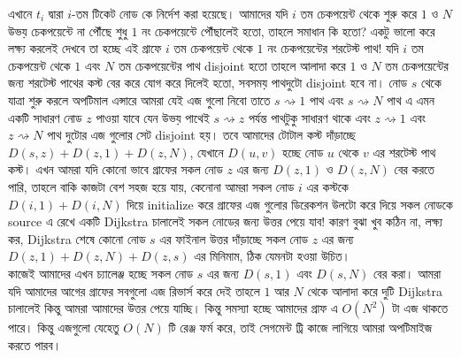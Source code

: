 \documentclass[11pt]{article}
\begin{document}
\begin{center}
\end{center}
এখানে $t_i$ দ্বারা $i$-তম টিকেট নোড কে নির্দেশ করা হয়েছে। আমাদের যদি $i$ তম চেকপয়েন্ট থেকে শুরু করে $1$ ও $N$ উভয় চেকপয়েন্টে না পৌঁছে শুধু $1$ নং চেকপয়েন্টে পৌঁছালেই হতো, তাহলে সমাধান কি হতো? একটু ভালো করে লক্ষ্য করলেই দেখবে তা হচ্ছে এই গ্রাফে $i$ তম চেকপয়েন্ট থেকে $1$ নং চেকপয়েন্টের শরটেস্ট পাথ! যদি $i$ তম চেকপয়েন্ট থেকে $1$ এবং $N$ তম চেকপয়েন্টের পাথ disjoint হতো তাহলে আলাদা করে $1$ ও $N$ তম চেকপয়েন্টের জন্য শরটেস্ট পাথের কস্ট বের করে যোগ করে দিলেই হতো, সবসময় পাথদুটো disjoint হবে না। নোড $s$ থেকে যাত্রা শুরু করলে অপটিমাল এন্সারে আমরা যেই এজ গুলো নিবো তাতে $s \rightsquigarrow 1$ পাথ এবং $s \rightsquigarrow N$ পাথ এ এমন একটি সাধারণ নোড $z$ পাওয়া যাবে যেন উভয় পাথেই $s \rightsquigarrow z$ পর্যন্ত পাথটুকু সাধারণ থাকে এবং $z \rightsquigarrow 1$ এবং $z \rightsquigarrow N$ পাথ দুটোর এজ গুলোর সেট disjoint হয়। তবে আমাদের টোটাল কস্ট দাঁড়াচ্ছে $D(s,z) + D(z,1)+D(z,N)$, যেখানে $D(u,v)$ হচ্ছে নোড $u$ থেকে $v$ এর শরটেস্ট পাথ কস্ট। এখন আমরা যদি কোনো ভাবে গ্রাফের সকল নোড $z$ এর জন্য $D(z, 1)$ ও $D(z,N)$ বের করতে পারি, তাহলে বাকি কাজটা বেশ সহজ হয়ে যায়, কেনোনা আমরা সকল নোড $i$ এর কস্টকে $D(i,1)+D(i,N)$ দিয়ে initialize করে গ্রাফের এজ গুলোর ডিরেকশন উলটো করে দিয়ে সকল নোডকে source এ রেখে একটি Dijkstra চালালেই সকল নোডের জন্য উত্তর পেয়ে যাব! কারণ বুঝা খুব কঠিন না, লক্ষ্য কর, Dijkstra শেষে কোনো নোড $s$ এর ফাইনাল উত্তর দাঁড়াচ্ছে সকল নোড $z$ এর জন্য $D(z,1)+D(z,N)+D(z,s)$ এর মিনিমাম, ঠিক যেমনটা হওয়া উচিত। 
\\
কাজেই আমাদের এখন চ্যালেঞ্জ হচ্ছে সকল নোড $s$ এর জন্য $D(s,1)$ এবং $D(s,N)$ বের করা। আমরা যদি আমাদের আগের গ্রাফের সবগুলো এজ রিভার্স করে দেই তাহলে $1$ আর $N$ থেকে আলাদা করে দুটি Dijkstra চালালেই কিন্তু আমরা আমাদের উত্তর পেয়ে যাচ্ছি। কিন্তু সমস্যা হচ্ছে আমাদের গ্রাফ এ $O(N^2)$ টা এজ থাকতে পারে। কিন্তু এজগুলো যেহেতু $O(N)$ টি রেঞ্জ ফর্ম করে, তাই সেগমেন্ট ট্রি কাজে লাগিয়ে আমরা অপটিমাইজ করতে পারব। 
\end{document}
